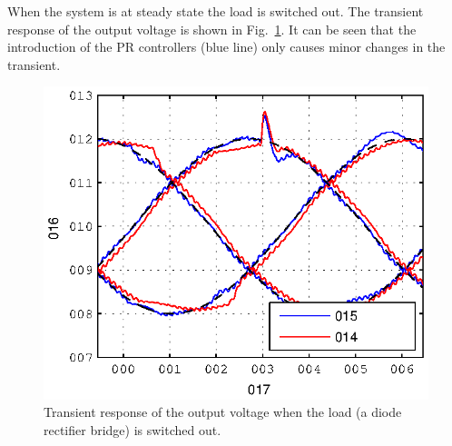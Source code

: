 \documentclass[conference,10pt]{IEEEtran}
\begin{document}
When the system is at steady state the load is switched out. The transient response of the output voltage is shown in Fig.~\ref{fig:trans_vc}. It can be seen that the introduction of the PR controllers (blue line) only causes minor changes in the transient.
\begin{figure}[!h]
\centering

\includegraphics{fig/transient_vCf}
\caption{Transient response of the output voltage when the load (a diode rectifier bridge) is switched out.}
\label{fig:trans_vc}
\end{figure}
\end{document}
